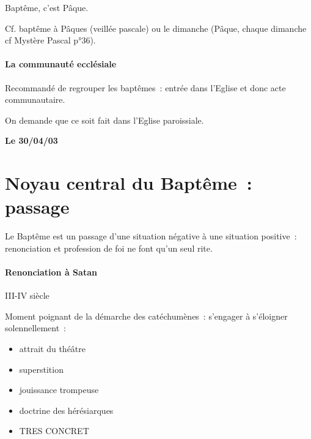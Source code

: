 Baptême, c'est Pâque.

Cf. baptême à Pâques (veillée pascale) ou le dimanche (Pâque, chaque
dimanche cf Mystère Pascal p°36).

\hypertarget{la-communautuxe9-eccluxe9siale}{%
\paragraph{La communauté
ecclésiale}\label{la-communautuxe9-eccluxe9siale}}

Recommandé de regrouper les baptêmes~: entrée dans l'Eglise et donc acte
communautaire.

On demande que ce soit fait dans l'Eglise paroissiale.

\textbf{Le 30/04/03}

\hypertarget{b.-noyau-central-du-baptuxeame-passage}{%
\section{Noyau central du Baptême~:
passage}\label{b.-noyau-central-du-baptuxeame-passage}}

Le Baptême est un passage d'une situation négative à une situation
positive~: renonciation et profession de foi ne font qu'un seul rite.

\hypertarget{renonciation-uxe0-satan}{%
\paragraph{Renonciation à Satan}\label{renonciation-uxe0-satan}}

III-IV siècle

Moment poignant de la démarche des catéchumènes~: s'engager à s'éloigner
solennellement~:

\begin{itemize}
\item
   
  attrait du théâtre
   
\item
   
  superstition
   
\item
   
  jouissance trompeuse
   
\item
   
  doctrine des hérésiarques
   
\item
   
  TRES CONCRET
   
\end{itemize}

